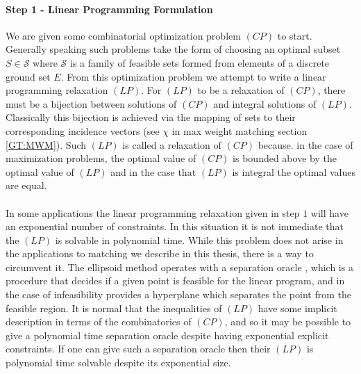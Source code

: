 \paragraph{Step 1 - Linear Programming Formulation}
We are given some combinatorial optimization  problem $(CP)$ to start. Generally speaking such problems take the form of choosing an optimal subset $S \in \mathcal{S}$ where $\mathcal{S}$ is a family of feasible sets formed from elements of a discrete ground set $E$. From this optimization problem we attempt to write a linear programming relaxation $(LP)$. For $(LP)$ to be a relaxation of $(CP)$, there must be a bijection between solutions of $(CP)$ and integral solutions of $(LP)$. Classically this bijection is achieved via the mapping of sets to their corresponding incidence vectors (see $\chi$ in max weight matching section \ref{GT:MWM}). Such $(LP)$ is called a relaxation of $(CP)$ because. in the case of maximization problems, the optimal value of $(CP)$ is bounded above by the optimal value of $(LP)$ and in the case that $(LP)$ is integral the optimal values are equal.
\paragraph{}
In some applications the linear programming relaxation given in step $1$ will have an exponential number of constraints. In this situation it is not immediate that the $(LP)$ is solvable in polynomial time. While this problem does not arise in the applications to matching we describe in this thesis, there is a way to circumvent it. The ellipsoid method operates with a separation oracle \cite{grotschel1981ellipsoid}, which is a procedure that decides if a given point is feasible for the linear program, and in the case of infeasibility provides a hyperplane which separates the point from the feasible region. It is normal that the inequalities of $(LP)$ have some implicit description in terms of the combinatorics of $(CP)$, and so it may be possible to give a polynomial time separation oracle despite having exponential explicit constraints. If one can give such a separation oracle then their $(LP)$ is polynomial time solvable despite its exponential size.
